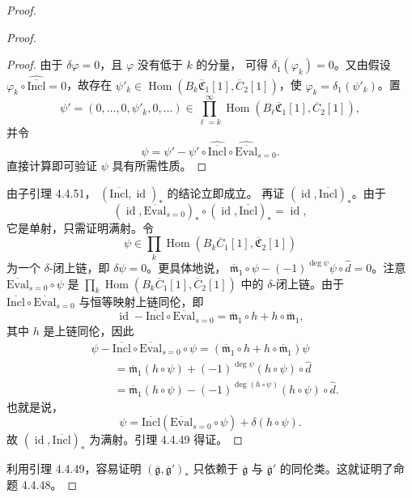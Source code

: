 \begin{proof}
\begin{proof}
\begin{proof}
由于 $\delta\varphi=0$，且 $\varphi$ 没有低于 $k$ 的分量，
可得 $\delta_1(\varphi_k)=0$。又由假设
$\varphi_k\circ\widehat{\overline{\mathrm{Incl}}}=0$，故存在
$\psi'_k\in\operatorname{Hom}
(B_k\overline{\mathfrak C}_1[1],\overline C_2[1])$，使
$\varphi_k=\delta_1(\psi'_k)$。置
\[
 \psi'=(0,\ldots,0,\psi'_k,0,\ldots)
 \in\prod_{\ell=k}^{\infty}
 \operatorname{Hom}(B_\ell\overline{\mathfrak C}_1[1],
 \overline C_2[1]),
\]
并令
\[
 \psi=\psi'-\psi'\circ
 \widehat{\overline{\mathrm{Incl}}}
 \circ\widehat{\overline{\mathrm{Eval}}}_{s=0}.
\]
直接计算即可验证 $\psi$ 具有所需性质。
\end{proof}

由子引理 4.4.51，
$(\overline{\mathrm{Incl}},\operatorname{id})_*$ 的结论立即成立。
再证 $(\operatorname{id},\overline{\mathrm{Incl}})_*$。由于
\[
 (\operatorname{id},\overline{\mathrm{Eval}}_{s=0})_*
 \circ(\operatorname{id},\overline{\mathrm{Incl}})_*
 =\operatorname{id},
\]
它是单射，只需证明满射。令
\[
 \psi\in\prod_k\operatorname{Hom}
 (B_k\overline C_1[1],\overline{\mathfrak C}_2[1])
\]
为一个 $\delta$-闭上链，即 $\delta\psi=0$。更具体地说，
$\overline{\mathfrak m}_1\circ\psi
-(-1)^{\deg\psi}\psi\circ\widehat d=0$。注意
$\overline{\mathrm{Eval}}_{s=0}\circ\psi$
是
$\prod_k\operatorname{Hom}
(B_k\overline C_1[1],\overline C_2[1])$
中的 $\delta$-闭上链。由于
$\overline{\mathrm{Incl}}\circ
\overline{\mathrm{Eval}}_{s=0}$ 与恒等映射上链同伦，即
\[
 \operatorname{id}-\overline{\mathrm{Incl}}\circ
 \overline{\mathrm{Eval}}_{s=0}
 =\overline{\mathfrak m}_1\circ h
 +h\circ\overline{\mathfrak m}_1,
\]
其中 $h$ 是上链同伦，因此
\[
 \begin{aligned}
 &\psi-\overline{\mathrm{Incl}}\circ
 \overline{\mathrm{Eval}}_{s=0}\circ\psi
 =(\overline{\mathfrak m}_1\circ h
 +h\circ\overline{\mathfrak m}_1)\psi\\
 &\qquad=\overline{\mathfrak m}_1(h\circ\psi)
 +(-1)^{\deg\psi}(h\circ\psi)\circ\widehat d\\
 &\qquad=\overline{\mathfrak m}_1(h\circ\psi)
 -(-1)^{\deg(h\circ\psi)}
 (h\circ\psi)\circ\widehat d.
 \end{aligned}
\]
也就是说，
\[
 \psi=\overline{\mathrm{Incl}}
 (\overline{\mathrm{Eval}}_{s=0}\circ\psi)
 +\delta(h\circ\psi).
\]
故 $(\operatorname{id},\overline{\mathrm{Incl}})_*$ 为满射。引理
4.4.49 得证。
\end{proof}

利用引理 4.4.49，容易证明
$(\overline{\mathfrak g},\overline{\mathfrak g}')_*$
只依赖于 $\overline{\mathfrak g}$ 与
$\overline{\mathfrak g}'$ 的同伦类。这就证明了命题 4.4.48。
\end{proof}

